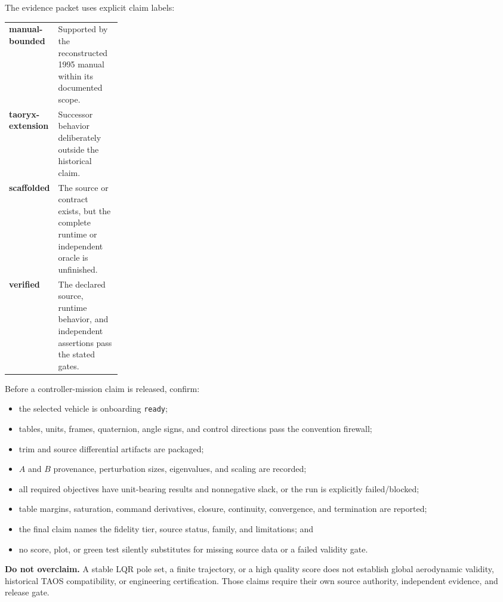 \documentclass[11pt]{article}
\newcommand{\warningbox}[1]{%
  \par\noindent\colorbox{paleyellow}{\parbox{0.94\linewidth}{#1}}\par
}
\begin{document}
The evidence packet uses explicit claim labels:

\begin{center}
\begin{tabularx}{0.94\linewidth}{>{\bfseries}p{0.22\linewidth}Y}
\toprule
manual-bounded & Supported by the reconstructed 1995 manual within its documented scope.\\
taoryx-extension & Successor behavior deliberately outside the historical claim.\\
scaffolded & The source or contract exists, but the complete runtime or independent oracle is unfinished.\\
verified & The declared source, runtime behavior, and independent assertions pass the stated gates.\\
\bottomrule
\end{tabularx}
\end{center}

Before a controller-mission claim is released, confirm:

\begin{itemize}
  \item the selected vehicle is onboarding \texttt{ready};
  \item tables, units, frames, quaternion, angle signs, and control directions
    pass the convention firewall;
  \item trim and source differential artifacts are packaged;
  \item $A$ and $B$ provenance, perturbation sizes, eigenvalues, and scaling
    are recorded;
  \item all required objectives have unit-bearing results and nonnegative
    slack, or the run is explicitly failed/blocked;
  \item table margins, saturation, command derivatives, closure, continuity,
    convergence, and termination are reported;
  \item the final claim names the fidelity tier, source status, family, and
    limitations; and
  \item no score, plot, or green test silently substitutes for missing source
    data or a failed validity gate.
\end{itemize}

\warningbox{\textbf{Do not overclaim.} A stable LQR pole set, a finite trajectory,
or a high quality score does not establish global aerodynamic validity,
historical TAOS compatibility, or engineering certification. Those claims
require their own source authority, independent evidence, and release gate.}
\end{document}
